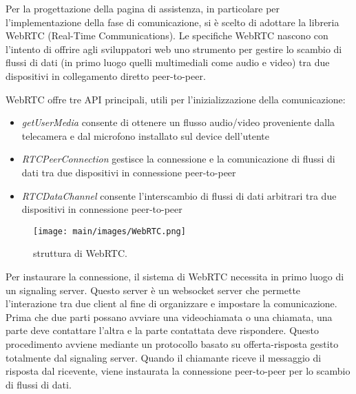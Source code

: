 Per la progettazione della pagina di assistenza, in particolare per l'implementazione della fase di comunicazione, si è scelto di adottare la libreria WebRTC (Real-Time Communications).
Le specifiche WebRTC nascono con l’intento di offrire agli sviluppatori web uno strumento per gestire lo scambio di flussi di dati (in primo luogo quelli multimediali come audio e video) tra due dispositivi in collegamento diretto peer-to-peer.

WebRTC offre tre API principali, utili per l'inizializzazione della comunicazione:
\begin{itemize}
    \item \textit{getUserMedia} consente di ottenere un flusso audio/video proveniente dalla telecamera e dal microfono installato sul device dell’utente 
    \item \textit{RTCPeerConnection} gestisce la connessione e la comunicazione di flussi di dati tra due dispositivi in connessione peer-to-peer
    \item \textit{RTCDataChannel} consente l’interscambio di flussi di dati arbitrari tra due dispositivi in connessione peer-to-peer
\end{itemize}

\begin{figure}
\begin{center}
\texttt{[image: main/images/WebRTC.png]}
\end{center}
\caption{struttura di WebRTC.}
\label{fig:reduxFlow}
\end{figure}

Per instaurare la connessione, il sistema di WebRTC necessita in primo luogo di un signaling server. Questo server è un websocket server che permette l'interazione tra due client al fine di organizzare e impostare la comunicazione. 
Prima che due parti possano avviare una videochiamata o una chiamata, una parte deve contattare l'altra e la parte contattata deve rispondere. Questo procedimento avviene mediante un protocollo basato su offerta-risposta gestito totalmente dal signaling server.
Quando il chiamante riceve il messaggio di risposta dal ricevente, viene instaurata la connessione peer-to-peer per lo scambio di flussi di dati.


